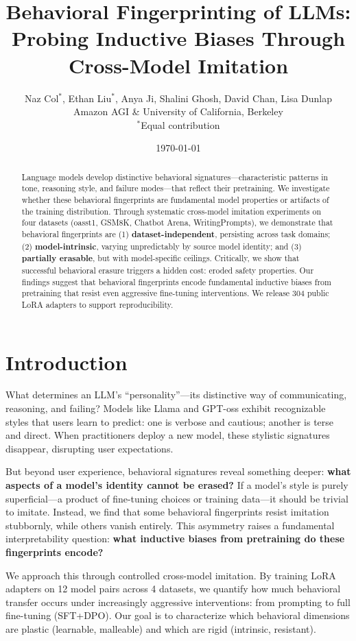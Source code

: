 \documentclass[11pt]{article}
\title{Behavioral Fingerprinting of LLMs: Probing Inductive Biases Through Cross-Model Imitation}
\author{%
   Naz Col$^*$, Ethan Liu$^*$, Anya Ji, Shalini Ghosh, David Chan, Lisa Dunlap \\
  Amazon AGI \& University of California, Berkeley \\
  {\small $^*$Equal contribution}
}
\date{\today}
\begin{document}
\maketitle

\begin{abstract}
Language models develop distinctive behavioral signatures---characteristic patterns in tone, reasoning style, and failure modes---that reflect their pretraining. We investigate whether these behavioral fingerprints are fundamental model properties or artifacts of the training distribution. Through systematic cross-model imitation experiments on four datasets (oasst1, GSM8K, Chatbot Arena, WritingPrompts), we demonstrate that behavioral fingerprints are (1) \textbf{dataset-independent}, persisting across task domains; (2) \textbf{model-intrinsic}, varying unpredictably by source model identity; and (3) \textbf{partially erasable}, but with model-specific ceilings. Critically, we show that successful behavioral erasure triggers a hidden cost: eroded safety properties. Our findings suggest that behavioral fingerprints encode fundamental inductive biases from pretraining that resist even aggressive fine-tuning interventions. We release 304 public LoRA adapters to support reproducibility.
\end{abstract}

\section{Introduction}

What determines an LLM's ``personality''---its distinctive way of communicating, reasoning, and failing? Models like Llama and GPT-oss exhibit recognizable styles that users learn to predict: one is verbose and cautious; another is terse and direct. When practitioners deploy a new model, these stylistic signatures disappear, disrupting user expectations.

But beyond user experience, behavioral signatures reveal something deeper: \textbf{what aspects of a model's identity cannot be erased?} If a model's style is purely superficial---a product of fine-tuning choices or training data---it should be trivial to imitate. Instead, we find that some behavioral fingerprints resist imitation stubbornly, while others vanish entirely. This asymmetry raises a fundamental interpretability question: \textbf{what inductive biases from pretraining do these fingerprints encode?}

We approach this through controlled cross-model imitation. By training LoRA adapters on 12 model pairs across 4 datasets, we quantify how much behavioral transfer occurs under increasingly aggressive interventions: from prompting to full fine-tuning (SFT+DPO). Our goal is to characterize which behavioral dimensions are plastic (learnable, malleable) and which are rigid (intrinsic, resistant).
\end{document}
